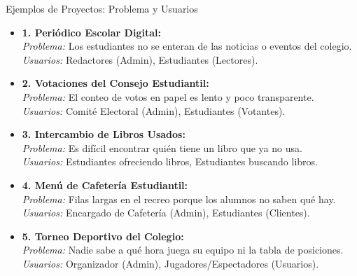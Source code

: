 \documentclass{beamer}
\begin{document}
\begin{frame}{Ejemplos de Proyectos: Problema y Usuarios}
    \begin{small}
    \begin{itemize}
        \item \textbf{1. Periódico Escolar Digital:} \\ \textit{Problema:} Los estudiantes no se enteran de las noticias o eventos del colegio. \\ \textit{Usuarios:} Redactores (Admin), Estudiantes (Lectores).
        \item \textbf{2. Votaciones del Consejo Estudiantil:} \\ \textit{Problema:} El conteo de votos en papel es lento y poco transparente. \\ \textit{Usuarios:} Comité Electoral (Admin), Estudiantes (Votantes).
        \item \textbf{3. Intercambio de Libros Usados:} \\ \textit{Problema:} Es difícil encontrar quién tiene un libro que ya no usa. \\ \textit{Usuarios:} Estudiantes ofreciendo libros, Estudiantes buscando libros.
        \item \textbf{4. Menú de Cafetería Estudiantil:} \\ \textit{Problema:} Filas largas en el recreo porque los alumnos no saben qué hay. \\ \textit{Usuarios:} Encargado de Cafetería (Admin), Estudiantes (Clientes).
        \item \textbf{5. Torneo Deportivo del Colegio:} \\ \textit{Problema:} Nadie sabe a qué hora juega su equipo ni la tabla de posiciones. \\ \textit{Usuarios:} Organizador (Admin), Jugadores/Espectadores (Usuarios).
    \end{itemize}
    \end{small}
\end{frame}
\end{document}
